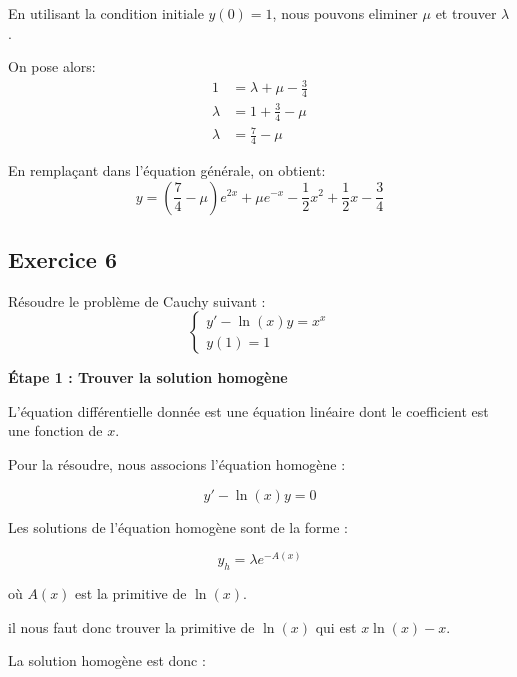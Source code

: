 \documentclass{article}
\begin{document}
En utilisant la condition initiale $y(0) = 1$, nous pouvons eliminer $\mu$ et trouver $\lambda$.

On pose alors:
\begin{equation*}
\begin{aligned}
    1 &= \lambda + \mu - \frac{3}{4}   \\
    \lambda &= 1 + \frac{3}{4} - \mu \\
    \lambda &= \frac{7}{4} - \mu
\end{aligned}
\end{equation*}

En remplaçant dans l'équation générale, on obtient:
\begin{equation*}
    y = (\frac{7}{4} - \mu)e^{2x} + \mu e^{-x} -\frac{1}{2}x^2 + \frac{1}{2}x - \frac{3}{4}
\end{equation*}



\subsection{Exercice 6}

Résoudre le problème de Cauchy suivant :
\begin{equation*}
\begin{cases}
    y' - \ln(x)y = x^x \\
    y(1) = 1
\end{cases}
\end{equation*}

\textbf{Étape 1 : Trouver la solution homogène}

L'équation différentielle donnée est une équation linéaire dont le coefficient est une fonction de \( x \).

Pour la résoudre, nous associons l'équation homogène :

\begin{equation*}
y' - \ln(x) y = 0
\end{equation*}

Les solutions de l'équation homogène sont de la forme :

\begin{equation*}
y_h = \lambda e^{-A(x)}
\end{equation*}

où \( A(x) \) est la primitive de \( \ln(x) \).

il nous faut donc trouver la primitive de \( \ln(x) \) qui est \( x \ln(x) - x \).

La solution homogène est donc :
\end{document}
